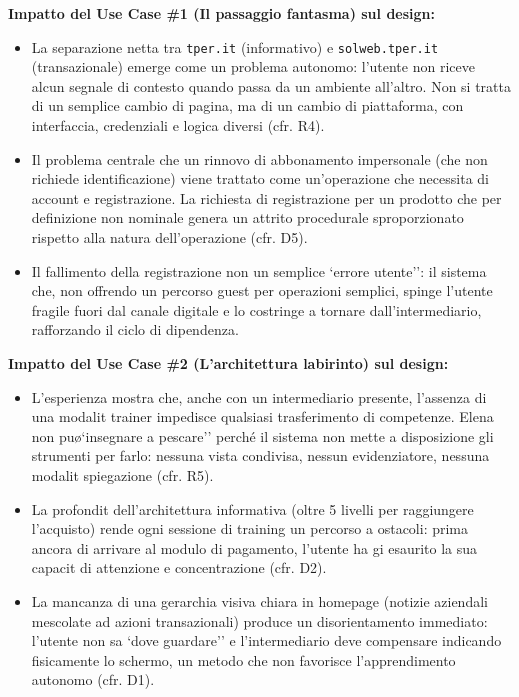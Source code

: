 \documentclass[11pt,a4paper]{article}
\begin{document}
\vspace{0.3cm}

\begin{tcolorbox}[colback=backgroundColor,colframe=borderColor,arc=2mm]
    {\small
    \textbf{Impatto del Use Case \#1 (Il passaggio fantasma) sul design:} \\[4pt]
    \begin{itemize}[leftmargin=*]
        \item La separazione netta tra \texttt{tper.it} (informativo) e \texttt{solweb.tper.it} (transazionale) emerge come un problema autonomo: l'utente non riceve alcun segnale di contesto quando passa da un ambiente all'altro. Non si tratta di un semplice cambio di pagina, ma di un cambio di piattaforma, con interfaccia, credenziali e logica diversi (cfr. R4).
        \item Il problema centrale \e che un rinnovo di abbonamento impersonale (che non richiede identificazione) viene trattato come un'operazione che necessita di account e registrazione. La richiesta di registrazione per un prodotto che per definizione non \e nominale genera un attrito procedurale sproporzionato rispetto alla natura dell'operazione (cfr. D5).
        \item Il fallimento della registrazione non \e un semplice `errore utente'': \e il sistema che, non offrendo un percorso guest per operazioni semplici, spinge l'utente fragile fuori dal canale digitale e lo costringe a tornare dall'intermediario, rafforzando il ciclo di dipendenza.
    \end{itemize}
    \vspace{0.2cm}
    \textbf{Impatto del Use Case \#2 (L'architettura labirinto) sul design:} \\[4pt]
    \begin{itemize}[leftmargin=*]
        \item L'esperienza mostra che, anche con un intermediario presente, l'assenza di una modalit\ trainer impedisce qualsiasi trasferimento di competenze. Elena non pu\o `insegnare a pescare'' perch\'e il sistema non mette a disposizione gli strumenti per farlo: nessuna vista condivisa, nessun evidenziatore, nessuna modalit\ spiegazione (cfr. R5).
        \item La profondit\ dell'architettura informativa (oltre 5 livelli per raggiungere l'acquisto) rende ogni sessione di training un percorso a ostacoli: prima ancora di arrivare al modulo di pagamento, l'utente ha gi\ esaurito la sua capacit\ di attenzione e concentrazione (cfr. D2).
        \item La mancanza di una gerarchia visiva chiara in homepage (notizie aziendali mescolate ad azioni transazionali) produce un disorientamento immediato: l'utente non sa `dove guardare'' e l'intermediario deve compensare indicando fisicamente lo schermo, un metodo che non favorisce l'apprendimento autonomo (cfr. D1).
    \end{itemize}
    }
\end{tcolorbox}
\end{document}
